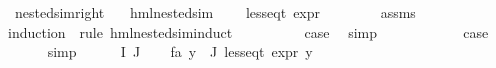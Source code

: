 \begin{isabellebody}
\isamarkupfalse%
\isanewline
\isanewline
{}\isamarkupfalse%
\ nested{\isacharunderscore}{\kern0pt}sim{\isacharunderscore}{\kern0pt}right{\isacharcolon}{\kern0pt}\isanewline
\ \ \ {\isachardoublequoteopen}hml{\isacharunderscore}{\kern0pt}{}{\isacharunderscore}{\kern0pt}nested{\isacharunderscore}{\kern0pt}sim\ {\isasymphi}{\isachardoublequoteclose}\isanewline
\ \ \ {\isachardoublequoteopen}less{\isacharunderscore}{\kern0pt}eq{\isacharunderscore}{\kern0pt}t\ {\isacharparenleft}{\kern0pt}expr\ {\isasymphi}{\isacharparenright}{\kern0pt}\ {\isacharparenleft}{\kern0pt}{\isasyminfinity}{\isacharcomma}{\kern0pt}\ {\isasyminfinity}{\isacharcomma}{\kern0pt}\ {\isasyminfinity}{\isacharcomma}{\kern0pt}\ {\isasyminfinity}{\isacharcomma}{\kern0pt}\ {\isasyminfinity}{\isacharcomma}{\kern0pt}\ {}{\isacharparenright}{\kern0pt}{\isachardoublequoteclose}\isanewline
%
\isadelimproof
%
\endisadelimproof
%
\isatagproof
{}\isamarkupfalse%
\ assms\isanewline
{}\isamarkupfalse%
{\isacharparenleft}{\kern0pt}induction\ {\isasymphi}\ rule{\isacharcolon}{\kern0pt}\ hml{\isacharunderscore}{\kern0pt}{}{\isacharunderscore}{\kern0pt}nested{\isacharunderscore}{\kern0pt}sim{\isachardot}{\kern0pt}induct{\isacharparenright}{\kern0pt}\isanewline
\ \ \isamarkupfalse%
\ {}\isanewline
\ \ \isamarkupfalse%
\ \isamarkupfalse%
\ {\isacharquery}{\kern0pt}case\ \isamarkupfalse%
\ simp\isanewline
{}\isamarkupfalse%
\isanewline
\ \ \isamarkupfalse%
\ {\isacharparenleft}{\kern0pt}{}\ {\isasymphi}\ {\isasymalpha}{\isacharparenright}{\kern0pt}\isanewline
\ \ \isamarkupfalse%
\ \isamarkupfalse%
\ {\isacharquery}{\kern0pt}case\ \isanewline
\ \ \ \ \isamarkupfalse%
\ simp\isanewline
{}\isamarkupfalse%
\isanewline
\ \ \isamarkupfalse%
\ {\isacharparenleft}{\kern0pt}{}\ {\isasymPhi}\ I\ J{\isacharparenright}{\kern0pt}\isanewline
\ \ \isamarkupfalse%
\ fa{\isacharcolon}{\kern0pt}\ {\isachardoublequoteopen}{\isasymforall}y{\isasymin}{\isasymPhi}\ {\isacharbackquote}{\kern0pt}\ J{\isachardot}{\kern0pt}\ less{\isacharunderscore}{\kern0pt}eq{\isacharunderscore}{\kern0pt}t\ {\isacharparenleft}{\kern0pt}expr\ y{\isacharparenright}{\kern0pt}\ {\isacharparenleft}{\kern0pt}{\isasyminfinity}{\isacharcomma}{\kern0pt}\ {\isasyminfinity}{\isacharcomma}{\kern0pt}\ {\isasyminfinity}{\isacharcomma}{\kern0pt}\ {\isasyminfinity}{\isacharcomma}{\kern0pt}\ {}{\isacharcomma}{\kern0pt}\ {}{\isacharparenright}{\kern0pt}{\isachardoublequoteclose}\isanewline

\end{isabellebody}
